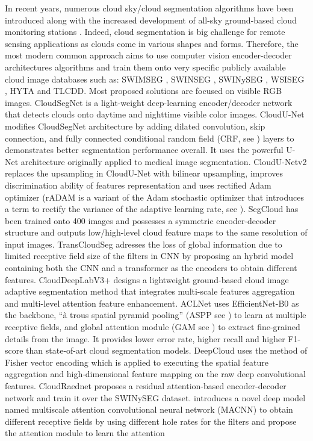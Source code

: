\documentclass[amt, article]{copernicus}
\begin{document}
In recent years, numerous cloud sky/cloud segmentation algorithms have been introduced along with the increased development of all-sky ground-based cloud monitoring stations \citep{Long2006, Yang2012, rs12111902, ASC2, Mommert2020, amt-15-3629-2022}.
Indeed, cloud segmentation is big challenge for remote sensing applications as clouds come in various shapes and forms. Therefore, the most modern common approach aims to use computer vision encoder-decoder architectures algorithms and train them onto very specific publicly available cloud image databases such as: SWIMSEG \citep{dev2016colorbased}, SWINSEG \citep{SWINSEG, dev2017nighttime}, SWINySEG \citep{dev2019cloudsegnet}, WSISEG \citep{SegCloud}, HYTA \citep{HYTA} and TLCDD. Most proposed solutions are focused on visible RGB images. CloudSegNet \citep{dev2019cloudsegnet} is a light-weight deep-learning encoder/decoder network that detects clouds onto daytime and nighttime visible color images. CloudU-Net \citep{CloudUNet} modifies CloudSegNet architecture by adding dilated convolution, skip connection, and fully connected conditional random field (CRF, see \citealt{McCallumCRF}) layers to demonstrates better segmentation performance overall. It uses the powerful U-Net architecture \citep{UNET} originally applied to medical image segmentation. CloudU-Netv2 \citep{CloudUNetv2} replaces the upsampling in CloudU-Net with bilinear upsampling, improves discrimination ability of features representation and uses rectified Adam optimizer (rADAM is a variant of the Adam stochastic optimizer \citep{ADAM} that introduces a term to rectify the variance of the adaptive learning rate, see \citealt{RADAM}). SegCloud \citep{SegCloud} has been trained onto 400 images and possesses a symmetric encoder-decoder structure and outputs low/high-level cloud feature maps to the same resolution of input images. TransCloudSeg \citep{TransCloudSeg} adresses the loss of global information due to limited receptive field size of the filters in CNN by proposing an hybrid model containing both the CNN and a transformer \citep{TRANSFORMER} as the encoders to obtain different features. CloudDeepLabV3+ \citep{CloudDeepLabV3} designs a lightweight ground-based cloud image adaptive segmentation method  that integrates multi-scale fea­tures aggregation and multi-level attention feature enhancement. ACLNet \citep{makwana2022aclnet} uses EfficientNet-B0 as the backbone, “à trous spatial pyramid pooling” (ASPP see \citealt{ATROUS}) to learn at multiple receptive fields, and global attention module (GAM see \citealt{GAM}) to extract fine-grained details from the image. It provides lower error rate, higher recall and higher F1-score than state-of-art cloud segmentation models. DeepCloud \citep{DeepCloud} uses the method of Fisher vector encoding which is applied to executing the spatial feature aggregation and high-dimensional feature mapping on the raw deep convolutional features. CloudRaednet \citep{shi2022cloudraednet} proposes a residual attention-based encoder-decoder network and train it over the SWINySEG dataset. \citealt{MACNN} introduces a novel deep model named multiscale attention convolutional neural network (MACNN) to obtain different receptive fields by using different hole rates for the filters and propose the attention module to learn the attention 
\end{document}
